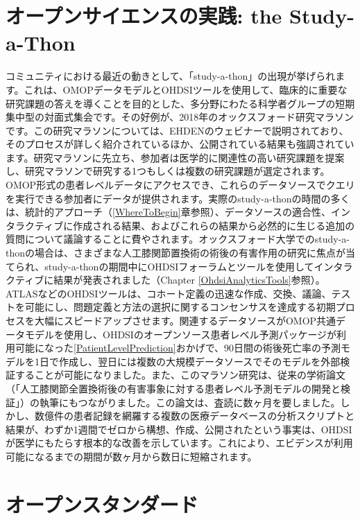 \documentclass[
  11pt]{book}
\theoremstyle{definition}
\theoremstyle{definition}
\theoremstyle{definition}
\theoremstyle{definition}
\theoremstyle{remark}
\begin{document}
\section{オープンサイエンスの実践: the Study-a-Thon}\label{ux30aaux30fcux30d7ux30f3ux30b5ux30a4ux30a8ux30f3ux30b9ux306eux5b9fux8df5-the-study-a-thon}


コミュニティにおける最近の動きとして、「study-a-thon」の出現が挙げられます。これは、OMOPデータモデルとOHDSIツールを使用して、臨床的に重要な研究課題の答えを導くことを目的とした、多分野にわたる科学者グループの短期集中型の対面式集会です。その好例が、2018年のオックスフォード研究マラソンです。この研究マラソンについては、EHDENのウェビナーで説明されており、そのプロセスが詳しく紹介されているほか、公開されている結果も強調されています。研究マラソンに先立ち、参加者は医学的に関連性の高い研究課題を提案し、研究マラソンで研究する1つもしくは複数の研究課題が選定されます。OMOP形式の患者レベルデータにアクセスでき、これらのデータソースでクエリを実行できる参加者にデータが提供されます。実際のstudy-a-thonの時間の多くは、統計的アプローチ（\ref{WhereToBegin}章参照）、データソースの適合性、インタラクティブに作成される結果、およびこれらの結果から必然的に生じる追加の質問について議論することに費やされます。オックスフォード大学でのstudy-a-thonの場合は、さまざまな人工膝関節置換術の術後の有害作用の研究に焦点が当てられ、study-a-thonの期間中にOHDSIフォーラムとツールを使用してインタラクティブに結果が発表されました（Chapter \ref{OhdsiAnalyticsTools}参照）。ATLASなどのOHDSIツールは、コホート定義の迅速な作成、交換、議論、テストを可能にし、問題定義と方法の選択に関するコンセンサスを達成する初期プロセスを大幅にスピードアップさせます。関連するデータソースがOMOP共通データモデルを使用し、OHDSIのオープンソース患者レベル予測パッケージが利用可能になった\ref{PatientLevelPrediction}おかげで、90日間の術後死亡率の予測モデルを1日で作成し、翌日には複数の大規模データソースでそのモデルを外部検証することが可能になりました。また、このマラソン研究は、従来の学術論文（「人工膝関節全置換術後の有害事象に対する患者レベル予測モデルの開発と検証」）の執筆にもつながりました。この論文は、査読に数ヶ月を要しました。しかし、数億件の患者記録を網羅する複数の医療データベースの分析スクリプトと結果が、わずか1週間でゼロから構想、作成、公開されたという事実は、OHDSIが医学にもたらす根本的な改善を示しています。これにより、エビデンスが利用可能になるまでの期間が数ヶ月から数日に短縮されます。

\section{オープンスタンダード}\label{ux30aaux30fcux30d7ux30f3ux30b9ux30bfux30f3ux30c0ux30fcux30c9}
\end{document}
